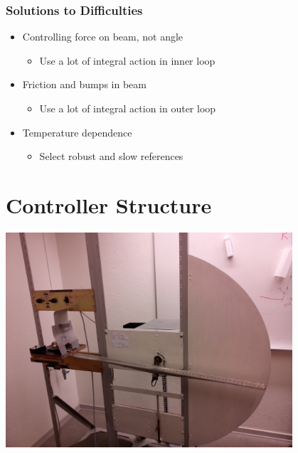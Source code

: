 \documentclass[
compress]
{beamer}
\begin{document}
\begin{frame}
\frametitle{Solutions to Difficulties}
\begin{itemize}
\item Controlling force on beam, not angle
\begin{itemize}
\item Use a lot of integral action in inner loop
\end{itemize}
\item Friction and bumps in beam
\begin{itemize}
\item Use a lot of integral action in outer loop
\end{itemize}
\item Temperature dependence
\begin{itemize}
\item Select robust and slow references
\end{itemize}
\end{itemize}
\end{frame}

\section{Controller Structure}
\frame{\sectionpage}
\begin{frame}
\centering
\includegraphics[width=0.8\textwidth]{figures/process_fig.jpg}
\end{frame}
\end{document}
